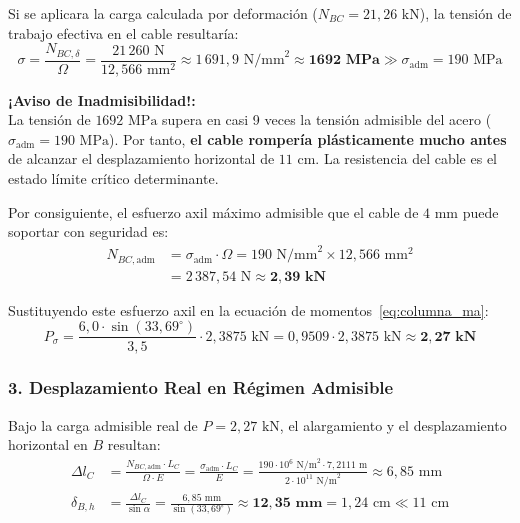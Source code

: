 Si se aplicara la carga calculada por deformación ($N_{BC} = 21{,}26\text{ kN}$), la tensión de trabajo efectiva en el cable resultaría:
\begin{equation}
    \sigma = \frac{N_{BC,\delta}}{\Omega} = \frac{21\,260\text{ N}}{12{,}566\text{ mm}^2} \approx 1\,691{,}9\text{ N/mm}^2 \approx \mathbf{1692\text{ MPa}} \gg \sigma_{\text{adm}} = 190\text{ MPa}
\end{equation}
\begin{tcolorbox}[colback=red!10!white, colframe=red!80!black, arc=3pt, boxrule=0.9pt]
    \textbf{¡Aviso de Inadmisibilidad!:}\\
    La tensión de $1692\text{ MPa}$ supera en casi 9 veces la tensión admisible del acero ($\sigma_{\text{adm}} = 190\text{ MPa}$). Por tanto, \textbf{el cable rompería plásticamente mucho antes} de alcanzar el desplazamiento horizontal de $11\text{ cm}$. La resistencia del cable es el estado límite crítico determinante.
\end{tcolorbox}

Por consiguiente, el esfuerzo axil máximo admisible que el cable de $4\text{ mm}$ puede soportar con seguridad es:
\begin{align}
    N_{BC,\text{adm}} &= \sigma_{\text{adm}} \cdot \Omega = 190\text{ N/mm}^2 \times 12{,}566\text{ mm}^2 \nonumber \\
    &= 2\,387{,}54\text{ N} \approx \mathbf{2{,}39\text{ kN}}
\end{align}

Sustituyendo este esfuerzo axil en la ecuación de momentos~\eqref{eq:columna_ma}:
\begin{equation}
    P_{\sigma} = \frac{6{,}0 \cdot \sin(33{,}69^\circ)}{3{,}5} \cdot 2{,}3875\text{ kN} = 0{,}9509 \cdot 2{,}3875\text{ kN} \approx \mathbf{2{,}27\text{ kN}}
\end{equation}

\subsubsection{3. Desplazamiento Real en Régimen Admisible}

Bajo la carga admisible real de $P = 2{,}27\text{ kN}$, el alargamiento y el desplazamiento horizontal en $B$ resultan:
\begin{align}
    \Delta l_C &= \frac{N_{BC,\text{adm}} \cdot L_C}{\Omega \cdot E} = \frac{\sigma_{\text{adm}} \cdot L_C}{E} = \frac{190 \cdot 10^6\text{ N/m}^2 \cdot 7{,}2111\text{ m}}{2 \cdot 10^{11}\text{ N/m}^2} \approx 6{,}85\text{ mm} \\
    \delta_{B,h} &= \frac{\Delta l_C}{\sin\alpha} = \frac{6{,}85\text{ mm}}{\sin(33{,}69^\circ)} \approx \mathbf{12{,}35\text{ mm}} = 1{,}24\text{ cm} \ll 11\text{ cm}
\end{align}

